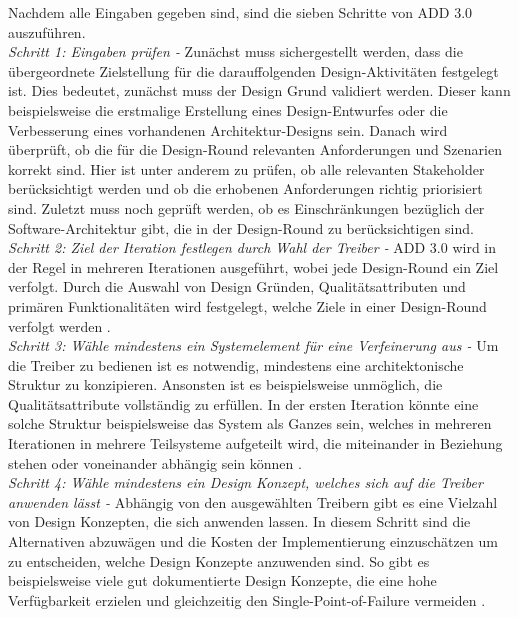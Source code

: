Nachdem alle Eingaben gegeben sind, sind die sieben Schritte von ADD 3.0 auszuf\"uhren.\\

\emph{Schritt 1: Eingaben pr\"ufen -}
Zun\"achst muss sichergestellt werden, dass die \"ubergeordnete Zielstellung f\"ur die darauffolgenden Design-Aktivit\"aten festgelegt ist. Dies bedeutet, zun\"achst muss der Design Grund validiert werden. Dieser kann beispielsweise die erstmalige Erstellung eines Design-Entwurfes oder die Verbesserung eines vorhandenen Architektur-Designs sein. Danach wird \"uberpr\"uft, ob die f\"ur die Design-Round relevanten Anforderungen und Szenarien korrekt sind. Hier ist unter anderem zu pr\"ufen, ob alle relevanten Stakeholder ber\"ucksichtigt werden und ob die erhobenen Anforderungen richtig priorisiert sind. Zuletzt muss noch gepr\"uft werden, ob es Einschr\"ankungen bez\"uglich der Software-Architektur gibt, die in der Design-Round zu ber\"ucksichtigen sind.\\

\emph{Schritt 2: Ziel der Iteration festlegen durch Wahl der Treiber -}
ADD 3.0 wird in der Regel in mehreren Iterationen ausgef\"uhrt, wobei jede Design-Round ein Ziel verfolgt. Durch die Auswahl von Design Gr\"unden, Qualit\"atsattributen und prim\"aren Funktionalit\"aten wird festgelegt, welche Ziele in einer Design-Round verfolgt werden \cite{Cer01}.\\

\emph{Schritt 3: W\"ahle mindestens ein Systemelement f\"ur eine Verfeinerung aus -}
Um die Treiber zu bedienen ist es notwendig, mindestens eine architektonische Struktur zu konzipieren. Ansonsten ist es beispielsweise unm\"oglich, die Qualit\"atsattribute vollst\"andig zu erf\"ullen. In der ersten Iteration k\"onnte eine solche Struktur beispielsweise das System als Ganzes sein, welches in mehreren Iterationen in mehrere Teilsysteme aufgeteilt wird, die miteinander in Beziehung stehen oder voneinander abh\"angig sein k\"onnen \cite{Cer01}.\\

\emph{Schritt 4: W\"ahle mindestens ein Design Konzept, welches sich auf die Treiber anwenden l\"asst -}
Abh\"angig von den ausgew\"ahlten Treibern gibt es eine Vielzahl von Design Konzepten, die sich anwenden lassen. In diesem Schritt sind die Alternativen abzuw\"agen und die Kosten der Implementierung einzusch\"atzen um zu entscheiden, welche Design Konzepte anzuwenden sind. So gibt es beispielsweise viele gut dokumentierte Design Konzepte, die eine hohe Verf\"ugbarkeit erzielen und gleichzeitig den Single-Point-of-Failure vermeiden \cite{Cer01}.\\

